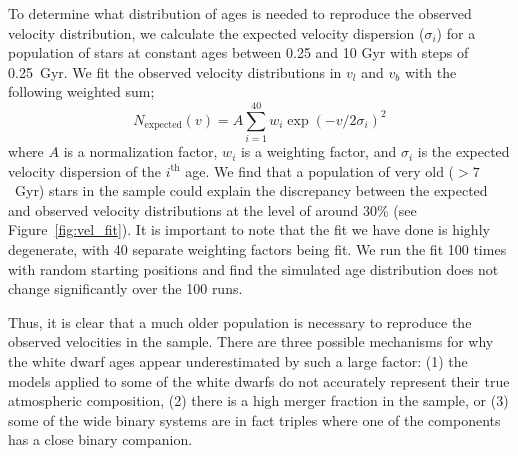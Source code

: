 \documentclass[twocolumn,linenumbers]{aastex631}
\begin{document}
To determine what distribution of ages is needed to reproduce the observed velocity distribution, we calculate the expected velocity dispersion ($\sigma_i$) for a population of stars at constant ages between 0.25 and 10 Gyr with steps of 0.25~Gyr. We fit the observed velocity distributions in $v_l$ and $v_b$ with the following weighted sum;
\begin{equation}
    N_{\mathrm{expected}}(v) = A\sum^{40}_{i=1} w_i \exp{(-v/2\sigma_i)^2}
\end{equation}
where $A$ is a normalization factor, $w_i$ is a weighting factor, and $\sigma_i$ is the expected velocity dispersion of the $i^{\mathrm{th}}$ age. We find that a population of very old ($>7$~Gyr) stars in the sample could explain the discrepancy between the expected and observed velocity distributions at the level of around 30\% (see Figure~\ref{fig:vel_fit}). It is important to note that the fit we have done is highly degenerate, with 40 separate weighting factors being fit. We run the fit 100 times with random starting positions and find the simulated age distribution does not change significantly over the 100 runs.


Thus, it is clear that a much older population is necessary to reproduce the observed velocities in the sample. There are three possible mechanisms for why the white dwarf ages appear underestimated by such a large factor: (1) the models applied to some of the white dwarfs do not accurately represent their true atmospheric composition, (2) there is a high merger fraction in the sample, or (3) some of the wide binary systems are in fact triples where one of the components has a close binary companion.
\end{document}
